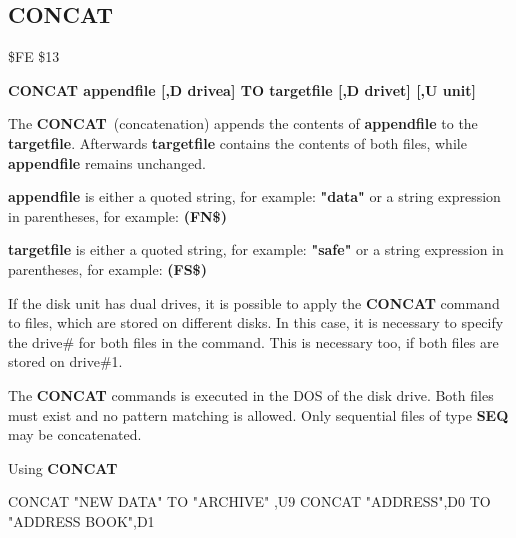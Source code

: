 \subsection{CONCAT}
\begin{description}[leftmargin=3cm,style=nextline]
\item [Token:] \$FE \$13
\item [Format:] {\bf CONCAT appendfile [,D drivea] TO
                targetfile [,D drivet] [,U unit] }
\item [Usage:]
   The {\bf CONCAT} (concatenation) appends the contents of
   {\bf appendfile} to the {\bf targetfile}. Afterwards {\bf targetfile}
   contains the contents of both files, while {\bf appendfile}
   remains unchanged.

   {\bf appendfile} is either a quoted string, for example: {\bf "data"} or
   a string expression in parentheses, for example: {\bf (FN\$)}

   {\bf targetfile} is either a quoted string, for example: {\bf "safe"} or
   a string expression in parentheses, for example: {\bf (FS\$)}

   If the disk unit has dual drives, it is possible to apply
   the {\bf CONCAT} command to files, which are stored on different
   disks. In this case, it is necessary to specify the drive\#
   for both files in the command. This is necessary too, if both
   files are stored on drive\#1.

   \drivedefinition

   \unitdefinition

\item [Remarks:]
   The {\bf CONCAT} commands is executed in the DOS of the disk drive.
   Both files must exist and no pattern matching is allowed.
   Only sequential files of type {\bf SEQ} may be concatenated.

\item [Example:] Using {\bf CONCAT}
\begin{screenoutput}
  CONCAT "NEW DATA" TO "ARCHIVE" ,U9
  CONCAT "ADDRESS",D0 TO "ADDRESS BOOK",D1
\end{screenoutput}
\end{description}


\newpage
